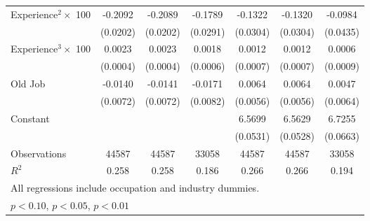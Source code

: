 {\begin{longtable}{l*{6}{c}}
Experience$^2\times$ 100&     -0.2092\sym{***}&     -0.2089\sym{***}&     -0.1789\sym{***}&     -0.1322\sym{***}&     -0.1320\sym{***}&     -0.0984\sym{**} \\
                    &    (0.0202)         &    (0.0202)         &    (0.0291)         &    (0.0304)         &    (0.0304)         &    (0.0435)         \\
Experience$^3\times$ 100&      0.0023\sym{***}&      0.0023\sym{***}&      0.0018\sym{***}&      0.0012\sym{*}  &      0.0012\sym{*}  &      0.0006         \\
                    &    (0.0004)         &    (0.0004)         &    (0.0006)         &    (0.0007)         &    (0.0007)         &    (0.0009)         \\
Old Job             &     -0.0140\sym{*}  &     -0.0141\sym{**} &     -0.0171\sym{**} &      0.0064         &      0.0064         &      0.0047         \\
                    &    (0.0072)         &    (0.0072)         &    (0.0082)         &    (0.0056)         &    (0.0056)         &    (0.0064)         \\
Constant            &                     &                     &                     &      6.5699\sym{***}&      6.5629\sym{***}&      6.7255\sym{***}\\
                    &                     &                     &                     &    (0.0531)         &    (0.0528)         &    (0.0663)         \\
\hline  
Observations        &       44587         &       44587         &       33058         &       44587         &       44587         &       33058         \\
\(R^{2}\)           &       0.258         &       0.258         &       0.186         &       0.266         &       0.266         &       0.194         \\
\hline  
\multicolumn{7}{l}{\footnotesize All regressions include occupation and industry dummies.}\\
\multicolumn{7}{l}{\footnotesize \sym{*} \(p<0.10\), \sym{**} \(p<0.05\), \sym{***} \(p<0.01\)}\\
\end{longtable}
}
